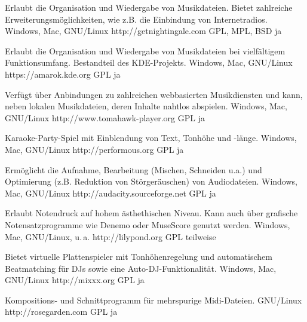 





{Erlaubt die Organisation und Wiedergabe von Musikdateien. Bietet zahlreiche Erweiterungsmöglichkeiten, wie z.B. die Einbindung von Internetradios.}
{Windows, Mac, GNU/Linux}
{http://getnightingale.com}
{GPL, MPL, BSD}
{ja}

{Erlaubt die Organisation und Wiedergabe von Musikdateien bei vielfältigem Funktionsumfang. Bestandteil des KDE-Projekts.}
{Windows, Mac, GNU/Linux}
{https://amarok.kde.org}
{GPL}
{ja}

{Verfügt über Anbindungen zu zahlreichen webbasierten Musikdiensten und kann, neben lokalen Musikdateien, deren Inhalte nahtlos abspielen.}
{Windows, Mac, GNU/Linux}
{http://www.tomahawk-player.org}  %
{GPL}
{ja}

{Karaoke-Party-Spiel mit Einblendung von Text, Tonhöhe und -länge.}
{Windows, Mac, GNU/Linux}
{http://performous.org}
{GPL}
{ja}


{Ermöglicht die Aufnahme, Bearbeitung (Mischen, Schneiden u.a.) und Optimierung (z.B. Reduktion von Störgeräuschen) von Audiodateien.}
{Windows, Mac, GNU/Linux}
{http://audacity.sourceforge.net}
{GPL}
{ja}

{Erlaubt Notendruck auf hohem ästhethischen Niveau. Kann auch über grafische Notensatzprogramme wie Denemo oder MuseScore genutzt werden.}
{Windows, Mac, GNU/Linux, u.\,a.}
{http://lilypond.org}
{GPL}
{teilweise}

{Bietet virtuelle Plattenspieler mit Tonhöhenregelung und automatischem Beatmatching für DJs sowie eine Auto-DJ-Funktionalität.}
{Windows, Mac, GNU/Linux}
{http://mixxx.org}
{GPL}
{ja}

{Kompositions- und Schnittprogramm für mehrspurige Midi-Dateien.}
{GNU/Linux}
{http://rosegarden.com}
{GPL}
{ja}

\backpage


